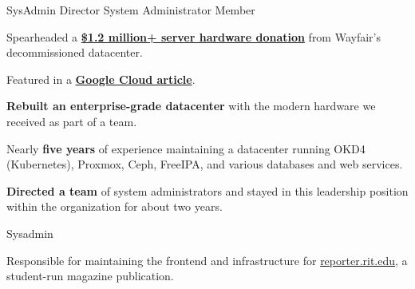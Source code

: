 \vspace{1.5pt} %


\cvtag{\LaTeX}

\smallskip


{
  {SysAdmin Director}    \hfill{}\newline
  {System Administrator} \hfill{}\newline
  {Member}               \hfill{}\newline
}
{
  \item{Spearheaded a \href{https://www.rit.edu/news/wayfair-gifts-850000-servers-rits-computer-science-house}{\textbf{\$1.2 million+ server hardware donation}} from Wayfair's decommissioned datacenter.}
  \item{Featured in a \href{https://cloud.google.com/blog/transform/wayfair-server-donation-mass-open-cloud-rit-student-innovation-johonnot}{\textbf{Google Cloud article}}.}
  \item{\textbf{Rebuilt an enterprise-grade datacenter} with the modern hardware we received as part of a team.}
  \item{Nearly \textbf{five years} of experience maintaining a datacenter running OKD4 (Kubernetes), Proxmox, Ceph, FreeIPA, and various databases and web services.}
  \item{\textbf{Directed a team} of system administrators and stayed in this leadership position within the organization for about two years.}
}

{
  {Sysadmin} \hfill{}\newline
}
{
  \item{Responsible for maintaining the frontend and infrastructure for \href{https://reporter.rit.edu}{reporter.rit.edu}, a student-run magazine publication.}
}

